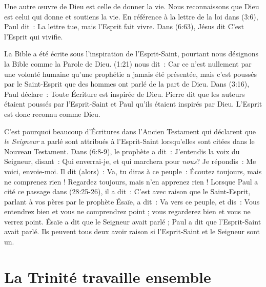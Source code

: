 Une autre œuvre de Dieu est celle de donner la vie. Nous reconnaissons que Dieu
 est celui qui donne et soutiens la vie.
 En référence à la lettre de la loi dans (3:6),
 Paul dit~: \og La lettre tue, mais l'Esprit fait vivre. \fg{}
 Dans (6:63), Jésus dit \og C'est l'Esprit qui vivifie.\fg{}

La Bible a été écrite sous l'inspiration de l'Esprit-Saint, pourtant nous
 désignons la Bible comme la Parole de Dieu.
 (1:21) nous dit~:
 \og Car ce n'est nullement par une volonté humaine qu'une prophétie a jamais
 été présentée, mais c'est poussés par le Saint-Esprit que des hommes ont parlé
 de la part de Dieu. \fg{}
 Dans (3:16), Paul déclare~:
 \og Toute Écriture est inspirée de Dieu. \fg{}
 Pierre dit que les auteurs étaient poussés par l'Esprit-Saint et Paul qu'ils
 étaient inspirés par Dieu. L'Esprit est donc reconnu comme Dieu.

C'est pourquoi beaucoup d'Écritures dans l'Ancien Testament qui déclarent que
 \emph{le Seigneur} a parlé sont attribués à l'Esprit-Saint lorsqu'elles
 sont citées dans le Nouveau Testament.
 Dans (6:8-9), le prophète a dit~: \og J'entendis la voix du
 Seigneur, disant~: Qui enverrai-je, et qui marchera pour \emph{nous}? Je répondis~:
 Me voici, envoie-moi. Il dit (alors)~: Va, tu diras à ce peuple~:
 Écoutez toujours, mais ne comprenez rien ! Regardez toujours, mais n'en
 apprenez rien ! \fg{}
 Lorsque Paul a cité ce passage dans (28:25-26), il a dit~:
 \og C'est avec raison que le Saint-Esprit, parlant à vos pères par le
 prophète Ésaïe, a dit~: Va vers ce peuple, et dis~: Vous entendrez bien et
 vous ne comprendrez point ; vous regarderez bien et vous ne verrez point. \fg{}
 Ésaïe a dit que le Seigneur avait parlé ; Paul a dit que l'Esprit-Saint
 avait parlé.
 Ils peuvent tous deux avoir raison si l'Esprit-Saint et le Seigneur sont un.


\section*{La Trinité travaille ensemble}

